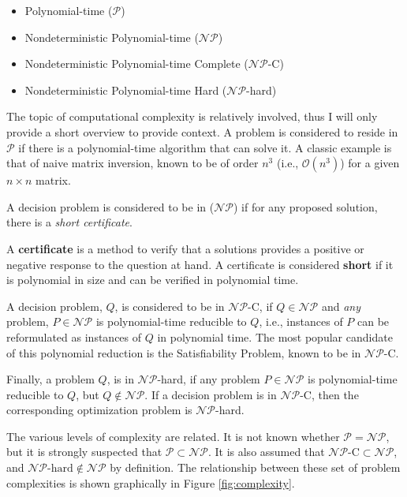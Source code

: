 \begin{itemize}
        \item Polynomial-time ($\mathcal{P}$)
        \item Nondeterministic Polynomial-time ($\mathcal{NP}$)
        \item Nondeterministic Polynomial-time Complete  ($\mathcal{NP}$-C)
        \item Nondeterministic Polynomial-time Hard  ($\mathcal{NP}$-hard)
\end{itemize}

The topic of computational complexity is relatively involved, thus I will only
provide a short overview to provide context. A problem is considered to reside
in $\mathcal{P}$ if there is a polynomial-time algorithm that can solve it. A
classic example is that of naive matrix inversion, known to be of order $n^3$
(i.e., $\mathcal{O}(n^3)$) for a given $n \times n$ matrix.

A decision problem is considered to be in ($\mathcal{NP}$) if for any proposed
solution, there is a \textit{short certificate}.

\begin{define}
A \textbf{certificate} is a method to verify that a solutions provides a
positive or negative response to the question at hand. A certificate is
considered \textbf{short} if it is polynomial in size and can be verified in
polynomial time.
\end{define}

A decision problem, $Q$, is considered to be in $\mathcal{NP}$-C, if
$Q \in \mathcal{NP}$ and \textit{any} problem, $P \in \mathcal{NP}$ is
polynomial-time reducible to $Q$, i.e., instances of $P$ can be reformulated as
instances of $Q$ in polynomial time. The most popular candidate of this
polynomial reduction is the Satisfiability Problem, known to be in
$\mathcal{NP}$-C.

Finally, a problem $Q$, is in $\mathcal{NP}$-hard, if any problem
$P \in \mathcal{NP}$ is polynomial-time reducible to $Q$, but
$Q \not\in \mathcal{NP}$. If a decision problem is in $\mathcal{NP}$-C, then the
corresponding optimization problem is $\mathcal{NP}$-hard.

The various levels of complexity are related. It is not known whether
$\mathcal{P} = \mathcal{NP}$, but it is strongly suspected that
$\mathcal{P} \subset \mathcal{NP}$. It is also assumed that
$\mathcal{NP}\text{-C} \subset \mathcal{NP}$, and
$\mathcal{NP}\text{-hard} \notin \mathcal{NP}$ by definition. The relationship
between these set of problem complexities is shown graphically in
Figure \ref{fig:complexity}.

